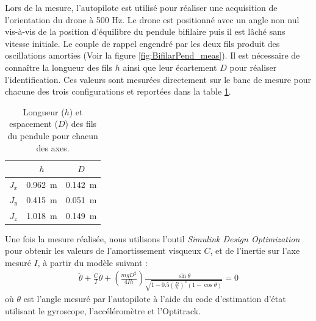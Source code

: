     Lors de la mesure, l'autopilote est utilisé pour réaliser une acquisition de l'orientation du drone à 500 Hz. Le drone est positionné avec un angle non nul vis-à-vis de la position d'équilibre du pendule bifilaire puis il est lâché sans vitesse initiale. Le couple de rappel engendré par les deux fils produit des oscillations amorties (Voir la figure \ref{fig:BifilarPend_meas}). Il est nécessaire de connaître la longueur des fils $h$ ainsi que leur écartement $D$ pour réaliser l'identification. Ces valeurs sont mesurées directement sur le banc de mesure pour chacune des trois configurations et reportées dans la table \ref{tab:lgFils}.

    \begin{table}[ht]
        \centering
        \begin{tabular}{|c|c|c|}
            \hline
             & $h$ & $D$  \\
            \hline\hline
            $J_{x}$ & \SI{0.962}{\meter}  & \SI{0.142}{\meter}  \\
            \hline 
            $J_{y}$ & \SI{0.415}{\meter}  & \SI{0.051}{\meter}  \\
            \hline
            $J_{z}$ & \SI{1.018}{\meter}  & \SI{0.149}{\meter} \\
            \hline
        \end{tabular}
        \caption{Longueur ($h$) et espacement ($D$) des fils du pendule pour chacun des axes.} 
        \label{tab:lgFils}
    \end{table}

    Une fois la mesure réalisée, nous utilisons l'outil \textit{Simulink Design Optimization} pour obtenir les valeurs de l'amortissement visqueux $C$, et de l'inertie sur l'axe mesuré $I$, à partir du modèle suivant :
    \begin{align*}
        \ddot{\theta} +  \frac{C}{I}\dot{\theta} + \left(\frac{mgD^2}{4Ih}\right)\frac{\sin\theta}{\sqrt{1 - 0.5\left(\frac{D}{h}\right)^2(1 - \cos\theta)}} = 0
    \end{align*}
    où $\theta$ est l'angle mesuré par l'autopilote à l'aide du code d'estimation d'état utilisant le gyroscope, l'accéléromètre et l'Optitrack.
    

